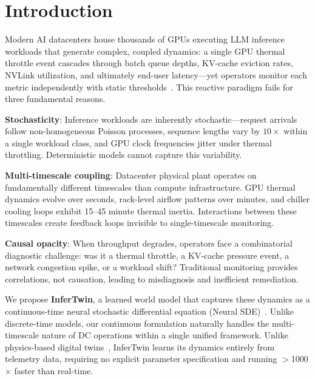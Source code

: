 \documentclass[conference,10pt]{IEEEtran}
\begin{document}
\section{Introduction}
\label{sec:intro}

Modern AI datacenters house thousands of GPUs executing LLM inference workloads that generate complex, coupled dynamics: a single GPU thermal throttle event cascades through batch queue depths, KV-cache eviction rates, NVLink utilization, and ultimately end-user latency---yet operators monitor each metric independently with static thresholds~\cite{nvidia2025dcgm}. This reactive paradigm fails for three fundamental reasons.

\textbf{Stochasticity}: Inference workloads are inherently stochastic---request arrivals follow non-homogeneous Poisson processes, sequence lengths vary by $10\times$ within a single workload class, and GPU clock frequencies jitter under thermal throttling. Deterministic models cannot capture this variability.

\textbf{Multi-timescale coupling}: Datacenter physical plant operates on fundamentally different timescales than compute infrastructure. GPU thermal dynamics evolve over seconds, rack-level airflow patterns over minutes, and chiller cooling loops exhibit 15--45 minute thermal inertia. Interactions between these timescales create feedback loops invisible to single-timescale monitoring.

\textbf{Causal opacity}: When throughput degrades, operators face a combinatorial diagnostic challenge: was it a thermal throttle, a KV-cache pressure event, a network congestion spike, or a workload shift? Traditional monitoring provides correlations, not causation, leading to misdiagnosis and inefficient remediation.

We propose \textbf{InferTwin}, a learned world model that captures these dynamics as a continuous-time neural stochastic differential equation (Neural SDE)~\cite{chen2018neural,li2020scalable}. Unlike discrete-time models, our continuous formulation naturally handles the multi-timescale nature of DC operations within a single unified framework. Unlike physics-based digital twins~\cite{grieves2014digital,tao2018digital}, InferTwin learns its dynamics entirely from telemetry data, requiring no explicit parameter specification and running $>$1000$\times$ faster than real-time.
\end{document}
